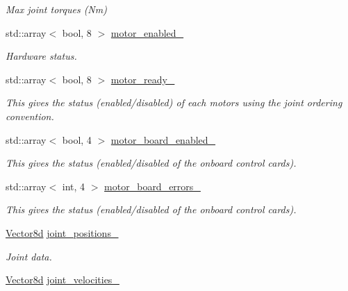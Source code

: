 \begin{DoxyCompactItemize}
\begin{DoxyCompactList}\small\item\em Max joint torques (Nm) \end{DoxyCompactList}\item 
std\+::array$<$ bool, 8 $>$ \hyperlink{classblmc__robots_1_1Solo8_a8966f925be4af6937b4544cb5dbc8eab}{motor\+\_\+enabled\+\_\+}
\begin{DoxyCompactList}\small\item\em Hardware status. \end{DoxyCompactList}\item 
std\+::array$<$ bool, 8 $>$ \hyperlink{classblmc__robots_1_1Solo8_a01868736d0656e8dd029b69297661b48}{motor\+\_\+ready\+\_\+}\hypertarget{classblmc__robots_1_1Solo8_a01868736d0656e8dd029b69297661b48}{}\label{classblmc__robots_1_1Solo8_a01868736d0656e8dd029b69297661b48}

\begin{DoxyCompactList}\small\item\em This gives the status (enabled/disabled) of each motors using the joint ordering convention. \end{DoxyCompactList}\item 
std\+::array$<$ bool, 4 $>$ \hyperlink{classblmc__robots_1_1Solo8_adfe55489326f302577d3d851e098bbaf}{motor\+\_\+board\+\_\+enabled\+\_\+}\hypertarget{classblmc__robots_1_1Solo8_adfe55489326f302577d3d851e098bbaf}{}\label{classblmc__robots_1_1Solo8_adfe55489326f302577d3d851e098bbaf}

\begin{DoxyCompactList}\small\item\em This gives the status (enabled/disabled of the onboard control cards). \end{DoxyCompactList}\item 
std\+::array$<$ int, 4 $>$ \hyperlink{classblmc__robots_1_1Solo8_af8f47463c79497bfa978ac90249ea144}{motor\+\_\+board\+\_\+errors\+\_\+}\hypertarget{classblmc__robots_1_1Solo8_af8f47463c79497bfa978ac90249ea144}{}\label{classblmc__robots_1_1Solo8_af8f47463c79497bfa978ac90249ea144}

\begin{DoxyCompactList}\small\item\em This gives the status (enabled/disabled of the onboard control cards). \end{DoxyCompactList}\item 
\hyperlink{common__header_8hpp_a98975ffbe0bca1296078e0350dfedd60}{Vector8d} \hyperlink{classblmc__robots_1_1Solo8_a2a731cc04e539d6fde3c3e5cd6922a42}{joint\+\_\+positions\+\_\+}
\begin{DoxyCompactList}\small\item\em Joint data. \end{DoxyCompactList}\item 
\hyperlink{common__header_8hpp_a98975ffbe0bca1296078e0350dfedd60}{Vector8d} \hyperlink{classblmc__robots_1_1Solo8_a4642f07d901c644a5ecacc8cd65b3c4e}{joint\+\_\+velocities\+\_\+}\hypertarget{classblmc__robots_1_1Solo8_a4642f07d901c644a5ecacc8cd65b3c4e}{}\label{classblmc__robots_1_1Solo8_a4642f07d901c644a5ecacc8cd65b3c4e}


\end{DoxyCompactItemize}
